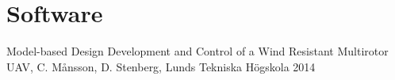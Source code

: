 \documentclass[a4paper]{article}
\begin{document}
\section{Software}

\begin{thebibliography}{99}
 Model-based Design Development and Control of a Wind Resistant Multirotor UAV, C. Månsson, D. Stenberg, Lunds Tekniska Högskola 2014
\end{thebibliography}
\end{document}
